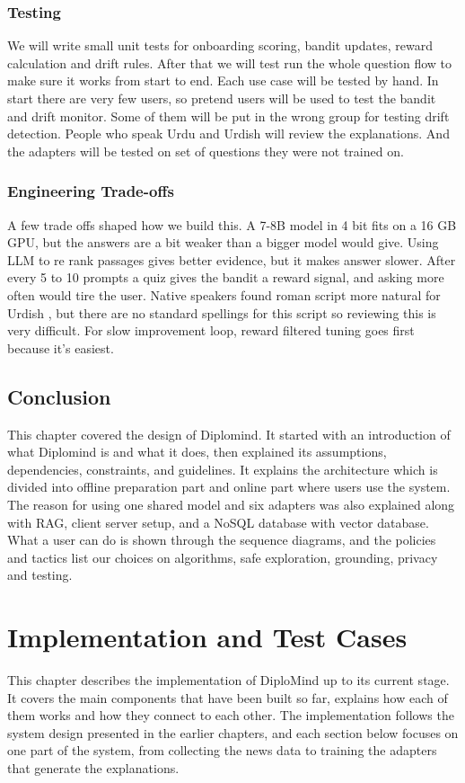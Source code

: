 \documentclass{FastFyp}
\begin{document}
\subsection{Testing}
We will write small unit tests for onboarding scoring, bandit updates, reward calculation and drift rules. After that we will test run the whole question flow to make sure it works from start to end. Each use case will be tested by hand. In start there are very few users, so pretend users will be used to test the bandit and drift monitor. Some of them will be put in the wrong group for testing drift detection. People who speak Urdu and Urdish will review the explanations. And the adapters will be tested on set of questions they were not trained on.

\subsection{Engineering Trade-offs}
A few trade offs shaped how we build this. A 7-8B model in 4 bit fits on a 16 GB GPU, but the answers are a bit weaker than a bigger model would give. Using LLM to re rank passages gives better evidence, but it makes answer slower. After every 5 to 10 prompts a quiz gives the bandit a reward signal, and asking more often would tire the user. Native speakers found roman script more natural for Urdish \cite{winata2026codeswitched}, but there are no standard spellings for this script so reviewing this is very difficult. For slow improvement loop, reward filtered tuning goes first because it's easiest.

\section{Conclusion}
This chapter covered the design of Diplomind. It started with an introduction of what Diplomind is and what it does, then explained its assumptions, dependencies, constraints, and guidelines. It explains the architecture which is divided into offline preparation part and online part where users use the system. The reason for using one shared model and six adapters was also explained along with RAG, client server setup, and a NoSQL database with vector database. What a user can do is shown through the sequence diagrams, and the policies and tactics list our choices on algorithms, safe exploration, grounding, privacy and testing.



\chapter{Implementation and Test Cases}
\label{ch:implementation}
This chapter describes the implementation of DiploMind up to its current stage. It covers the main components that have been built so far, explains how each of them works and how they connect to each other. The implementation follows the system design presented in the earlier chapters, and each section below focuses on one part of the system, from collecting the news data to training the adapters that generate the explanations.
\end{document}
